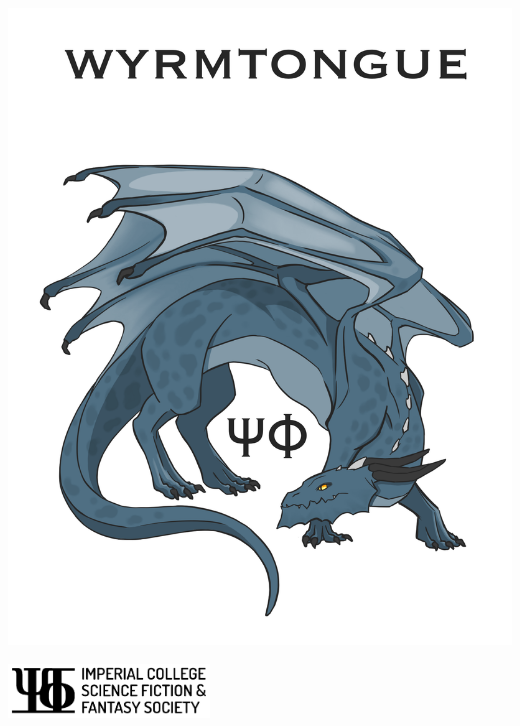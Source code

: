 \thispagestyle{empty}
\begin{center}
    \includegraphics[width=\textwidth]{img/cover-colour.png}
\end{center}
\par\vspace{\fill}
\begin{center}
  \includegraphics[width=0.4\textwidth]{img/logo/logo-alt.png}
\end{center}
